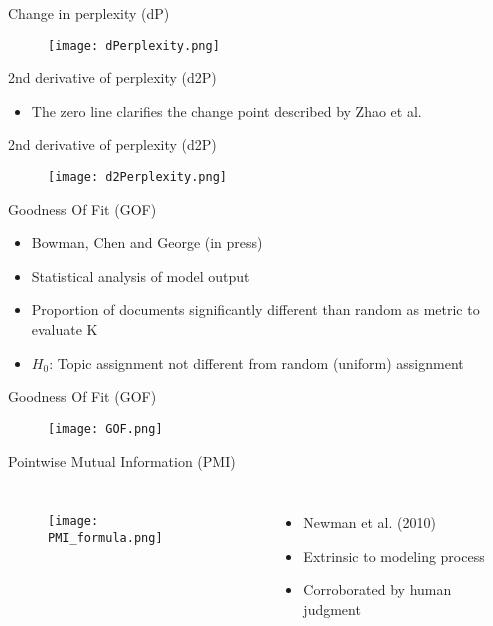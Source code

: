 \documentclass{beamer}
\begin{document}
\begin{frame}{Change in perplexity (dP)}
\begin{figure}[htb!]
\texttt{[image: dPerplexity.png]}
\end{figure}
\end{frame}



\begin{frame}{2nd derivative of perplexity (d2P)}
\begin{itemize}
\item The zero line clarifies the change point described by Zhao et al.
\end{itemize}
\end{frame}

\begin{frame}{2nd derivative of perplexity (d2P)}
\begin{figure}[htb!]
\texttt{[image: d2Perplexity.png]}
\end{figure}
\end{frame}



\begin{frame}{Goodness Of Fit (GOF)}
\begin{itemize}
\item Bowman, Chen and George (in press)
\item Statistical analysis of model output
\item Proportion of documents significantly different than random as metric to evaluate K

\item $H_{0}$: Topic assignment not different from random (uniform) assignment
\end{itemize}
\end{frame}

\begin{frame}{Goodness Of Fit (GOF)}
\begin{figure}[htb!]
\texttt{[image: GOF.png]}
\end{figure}
\end{frame}




\begin{frame}{Pointwise Mutual Information (PMI)}
\begin{columns}
\begin{figure}[htb!]
\texttt{[image: PMI\_formula.png]}
\end{figure}
\begin{itemize}
\item Newman et al. (2010)
\item Extrinsic to modeling process
\item Corroborated by human judgment
\end{itemize}
\end{columns}
\end{frame}
\end{document}
